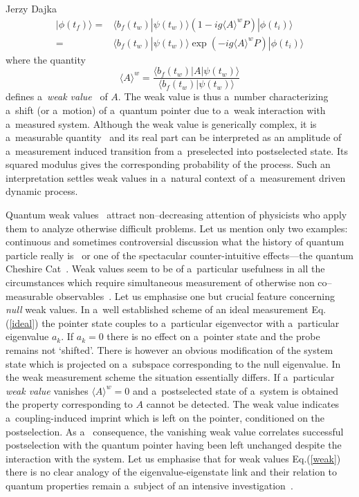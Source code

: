 \begin{artengenv}{Jerzy Dajka}
\begin{equation}
\begin{split}
    |\phi(t_f)\rangle= &\langle b_f(t_w)|\psi(t_w)\rangle \left( 1-ig\langle A\rangle^w P\right)|\phi(t_i)\rangle\\
    =&\langle b_f(t_w)|\psi(t_w)\rangle\exp(-ig\langle A\rangle^wP)|\phi(t_i)\rangle
\end{split}
\end{equation}
where the quantity
\begin{equation}\label{weak}
    \langle A\rangle^w=\frac{\langle b_f(t_w)|A|\psi(t_w)\rangle}{\langle b_f(t_w)|\psi(t_w)\rangle}
\end{equation}
 defines a~{\it weak value}~\parencite{primus} of $A$. The weak value is thus a~number characterizing
a~shift (or a~motion) of a~quantum pointer due to a~weak interaction with a~measured system. Although the weak value is generically  complex, it is a~measurable quantity~\parencite{weak_rmp} and its real part can be interpreted as an amplitude of a~measurement induced transition from a~preselected into postselected state. Its squared modulus gives the corresponding probability of the process. Such an interpretation settles  weak values in a~natural context of a~measurement driven dynamic process. 

Quantum weak values~\parencite{primus} attract non--decreasing attention of physicists who  apply them to analyze otherwise difficult problems. Let us mention only two examples: continuous and sometimes controversial discussion what the history of quantum particle really is~\parencite{PhysRevA.87.052104,PhysRevA.89.024102,PhysRevA.96.022126} or one of the  spectacular counter-intuitive effects---the quantum Cheshire Cat~\parencite{cat}. Weak values seem to be of a~particular usefulness in all the circumstances which  require simultaneous measurement of otherwise non co--measurable observables~\parencite{cat,weak,e20110854,Aharonov2008,weak_rmp}.  
%
Let us emphasise one but crucial feature concerning {\it null} weak values. In a~well established scheme of an ideal measurement Eq.(\ref{ideal}) the pointer state couples to a~particular eigenvector with a~particular eigenvalue $a_k$. If $a_k=0$ there is no effect on a~pointer state and the probe remains not `shifted'. There is however an obvious modification of the system state which is projected on a~subspace corresponding to the null eigenvalue. In the weak measurement scheme the situation essentially differs. If a~particular {\it weak value} vanishes $\langle A\rangle^w=0$  and a~postselected state of a~system is obtained  the property corresponding to $A$ cannot be detected. The weak value indicates a~coupling-induced imprint which is left on the pointer, conditioned on the postselection. As a~ consequence, the vanishing weak value
correlates successful postselection with the quantum pointer having been left unchanged despite the interaction with the system. Let us emphasise that for  weak values Eq.(\ref{weak})  there is no clear analogy of the eigenvalue-eigenstate link and their relation to quantum properties remain a~subject of an intensive investigation~\parencite{Matzkin_prop,weak,e20110854}.


\end{artengenv}
